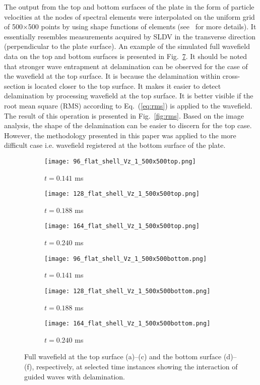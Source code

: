 The output from the top and bottom surfaces of the plate in the form of particle velocities at the nodes of spectral elements were interpolated on the uniform grid of 500\(\times\)500 points by using shape functions of elements (see~\cite{Kudela2020} for more details).
It essentially resembles measurements acquired by SLDV in the transverse direction (perpendicular to the plate surface).
An example of the simulated full wavefield data on the top and bottom surfaces is presented in Fig.~\ref{fig:wavefield}.
It should be noted that stronger wave entrapment at delamination can be observed for the case of the wavefield at the top surface.
It is because the delamination within cross-section is located closer to the top surface.
It makes it easier to detect delamination by processing wavefield at the top surface.
It is better visible if the root mean square (RMS) according to Eq.~(\ref{eq:rms}) is applied to the wavefield.
The result of this operation is presented in Fig.~\ref{fig:rms}.
Based on the image analysis, the shape of the delamination can be easier to discern for the top case.
However, the methodology presented in this paper was applied to the more difficult case i.e. wavefield registered at the bottom surface of the plate.

\begin{figure} [h!]
	\centering
	\begin{subfigure}[b]{0.32\textwidth}
		\centering
		\texttt{[image: 96\_flat\_shell\_Vz\_1\_500x500top.png]}
		\caption{\(t=0.141\) ms}
		\label{fig:frame96top}
	\end{subfigure}
	\hfill
	\begin{subfigure}[b]{0.32\textwidth}
		\centering
		\texttt{[image: 128\_flat\_shell\_Vz\_1\_500x500top.png]}
		\caption{\(t=0.188\) ms}
		\label{fig:frame128top}
	\end{subfigure}
	\hfill
	\begin{subfigure}[b]{0.32\textwidth}
		\centering
		\texttt{[image: 164\_flat\_shell\_Vz\_1\_500x500top.png]}
		\caption{\(t=0.240\) ms}
		\label{fig:frame164top}
	\end{subfigure}	
	\hfill
	\begin{subfigure}[b]{0.32\textwidth}
		\centering
		\texttt{[image: 96\_flat\_shell\_Vz\_1\_500x500bottom.png]}
		\caption{\(t=0.141\) ms}
		\label{fig:frame96bottom}
	\end{subfigure}
	\hfill
	\begin{subfigure}[b]{0.32\textwidth}
		\centering
		\texttt{[image: 128\_flat\_shell\_Vz\_1\_500x500bottom.png]}
		\caption{\(t=0.188\) ms}
		\label{fig:frame128bottom}
	\end{subfigure}
	\hfill
	\begin{subfigure}[b]{0.32\textwidth}
		\centering
		\texttt{[image: 164\_flat\_shell\_Vz\_1\_500x500bottom.png]}
		\caption{\(t=0.240\) ms}
		\label{fig:frame164bottom}
	\end{subfigure}

	\caption{Full wavefield at the top surface (a)--(c) and the bottom surface (d)--(f), respectively, at selected time instances showing the interaction of guided waves with delamination.}
	\label{fig:wavefield}
\end{figure} 

